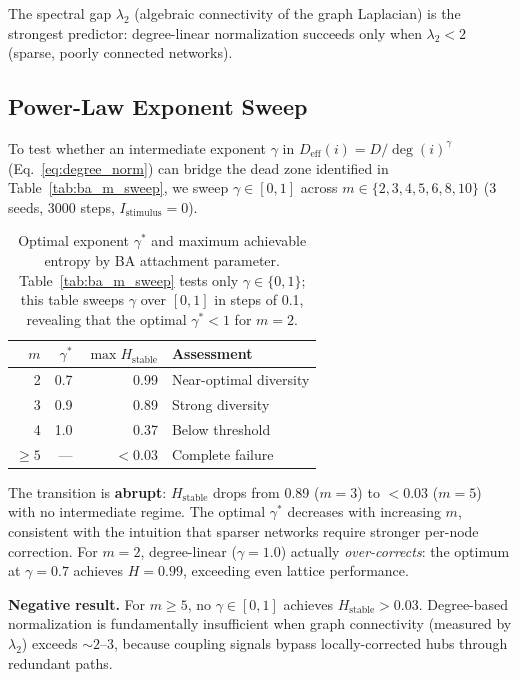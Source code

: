\documentclass[11pt]{article}
\begin{document}
The spectral gap $\lambda_2$ (algebraic connectivity of the graph Laplacian) is the strongest predictor: degree-linear normalization succeeds only when $\lambda_2 < 2$ (sparse, poorly connected networks).

\subsection{Power-Law Exponent Sweep}
\label{sec:alpha_sweep}

To test whether an intermediate exponent $\gamma$ in $D_{\text{eff}}(i) = D/\deg(i)^\gamma$ (Eq.~\ref{eq:degree_norm}) can bridge the dead zone identified in Table~\ref{tab:ba_m_sweep}, we sweep $\gamma \in [0, 1]$ across $m \in \{2, 3, 4, 5, 6, 8, 10\}$ (3 seeds, 3000 steps, $I_{\text{stimulus}} = 0$).

\begin{table}[ht]
\centering
\caption{Optimal exponent $\gamma^*$ and maximum achievable entropy by BA attachment parameter. Table~\ref{tab:ba_m_sweep} tests only $\gamma \in \{0, 1\}$; this table sweeps $\gamma$ over $[0, 1]$ in steps of 0.1, revealing that the optimal $\gamma^* < 1$ for $m = 2$.}
\label{tab:alpha_sweep}
\begin{tabular}{rrrl}
\toprule
$m$ & $\gamma^*$ & $\max H_{\text{stable}}$ & Assessment \\
\midrule
2  & 0.7 & 0.99 & Near-optimal diversity \\
3  & 0.9 & 0.89 & Strong diversity \\
4  & 1.0 & 0.37 & Below threshold \\
$\geq 5$ & --- & $< 0.03$ & Complete failure \\
\bottomrule
\end{tabular}
\end{table}

The transition is \textbf{abrupt}: $H_{\text{stable}}$ drops from 0.89 ($m = 3$) to $< 0.03$ ($m = 5$) with no intermediate regime. The optimal $\gamma^*$ decreases with increasing $m$, consistent with the intuition that sparser networks require stronger per-node correction. For $m = 2$, degree-linear ($\gamma = 1.0$) actually \emph{over-corrects}: the optimum at $\gamma = 0.7$ achieves $H = 0.99$, exceeding even lattice performance.

\textbf{Negative result.} For $m \geq 5$, no $\gamma \in [0, 1]$ achieves $H_{\text{stable}} > 0.03$. Degree-based normalization is fundamentally insufficient when graph connectivity (measured by $\lambda_2$) exceeds $\sim 2$--$3$, because coupling signals bypass locally-corrected hubs through redundant paths.
\end{document}
